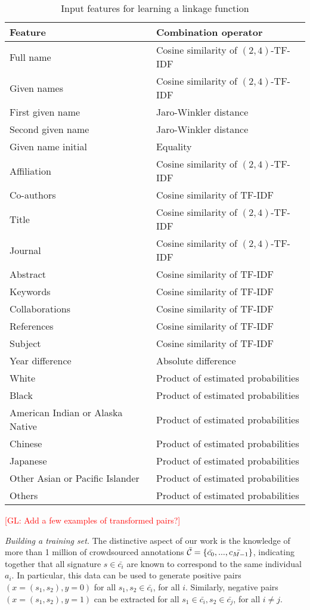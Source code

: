 \documentclass{article}
\newcommand{\glnote}[1]{\textcolor{red}{[GL: #1]}}
\begin{document}
\begin{table}
\caption{Input features for learning a linkage function}
\label{table:features}
\centering
\begin{tabular}{|l|l|}
  \hline
  \textbf{Feature} & \textbf{Combination operator}\\
  \hline
  \hline
  Full name & Cosine similarity of $(2,4)$-TF-IDF\\
  Given names & Cosine similarity of $(2,4)$-TF-IDF\\
  First given name & Jaro-Winkler distance\\
  Second given name & Jaro-Winkler distance\\
  Given name initial & Equality\\
  Affiliation & Cosine similarity of $(2,4)$-TF-IDF\\
  Co-authors & Cosine similarity of TF-IDF\\
  Title & Cosine similarity of $(2,4)$-TF-IDF\\
  Journal & Cosine similarity of $(2,4)$-TF-IDF\\
  Abstract & Cosine similarity of TF-IDF\\
  Keywords & Cosine similarity of TF-IDF\\
  Collaborations & Cosine similarity of TF-IDF\\
  References & Cosine similarity of TF-IDF\\
  Subject & Cosine similarity of TF-IDF\\
  Year difference & Absolute difference\\
  \hline
  White & Product of estimated probabilities\\
  Black & Product of estimated probabilities\\
  American Indian or Alaska Native & Product of estimated probabilities\\
  Chinese & Product of estimated probabilities\\
  Japanese & Product of estimated probabilities\\
  Other Asian or Pacific Islander & Product of estimated probabilities\\
  Others & Product of estimated probabilities\\
  \hline
\end{tabular}
\end{table}

\glnote{Add a few examples of transformed pairs?}

\textit{Building a training set.} The distinctive aspect of our work is the
knowledge of more than 1 million of crowdsourced annotations $\bar{\cal C} = \{
\bar{c_0}, ..., \bar{c_{M-1}} \}$, indicating together that all signature $s \in
\bar{c_i}$ are known to correspond to the same individual $a_i$. In particular,
this data can be used to generate positive pairs $(x=(s_1, s_2), y=0)$ for all
$s_1, s_2 \in \bar{c_i}$, for all $i$. Similarly, negative pairs $(x=(s_1,
s_2), y=1)$ can be extracted for all $s_1 \in \bar{c_i}, s_2 \in \bar{c_j}$, for
all $i \neq j$.
\end{document}
